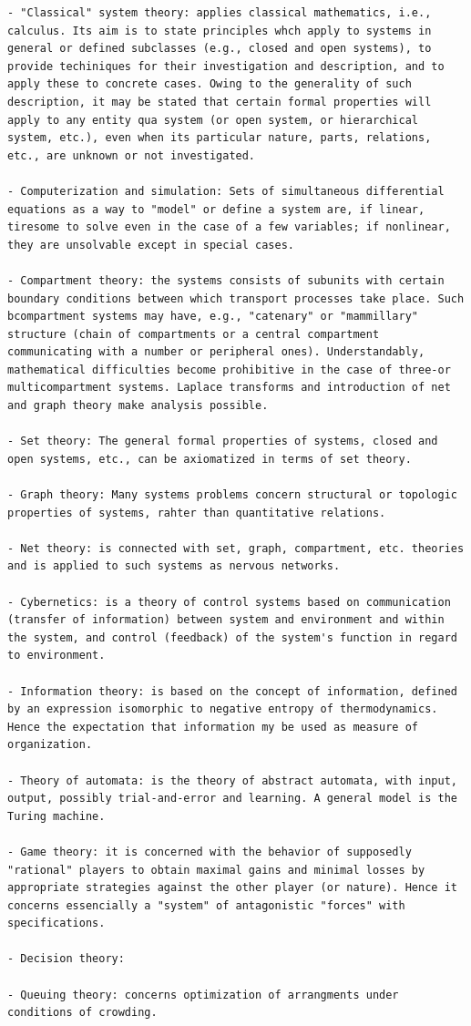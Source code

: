 \documentclass[
]{book}
\begin{document}
\begin{verbatim}
- "Classical" system theory: applies classical mathematics, i.e., calculus. Its aim is to state principles whch apply to systems in general or defined subclasses (e.g., closed and open systems), to provide techiniques for their investigation and description, and to apply these to concrete cases. Owing to the generality of such description, it may be stated that certain formal properties will apply to any entity qua system (or open system, or hierarchical system, etc.), even when its particular nature, parts, relations, etc., are unknown or not investigated.

- Computerization and simulation: Sets of simultaneous differential equations as a way to "model" or define a system are, if linear, tiresome to solve even in the case of a few variables; if nonlinear, they are unsolvable except in special cases.

- Compartment theory: the systems consists of subunits with certain boundary conditions between which transport processes take place. Such bcompartment systems may have, e.g., "catenary" or "mammillary" structure (chain of compartments or a central compartment communicating with a number or peripheral ones). Understandably, mathematical difficulties become prohibitive in the case of three-or multicompartment systems. Laplace transforms and introduction of net and graph theory make analysis possible.

- Set theory: The general formal properties of systems, closed and open systems, etc., can be axiomatized in terms of set theory.

- Graph theory: Many systems problems concern structural or topologic properties of systems, rahter than quantitative relations.

- Net theory: is connected with set, graph, compartment, etc. theories and is applied to such systems as nervous networks.

- Cybernetics: is a theory of control systems based on communication (transfer of information) between system and environment and within the system, and control (feedback) of the system's function in regard to environment.

- Information theory: is based on the concept of information, defined by an expression isomorphic to negative entropy of thermodynamics. Hence the expectation that information my be used as measure of organization.

- Theory of automata: is the theory of abstract automata, with input, output, possibly trial-and-error and learning. A general model is the Turing machine.

- Game theory: it is concerned with the behavior of supposedly "rational" players to obtain maximal gains and minimal losses by appropriate strategies against the other player (or nature). Hence it concerns essencially a "system" of antagonistic "forces" with specifications.

- Decision theory:

- Queuing theory: concerns optimization of arrangments under conditions of crowding.
\end{verbatim}
\end{document}
